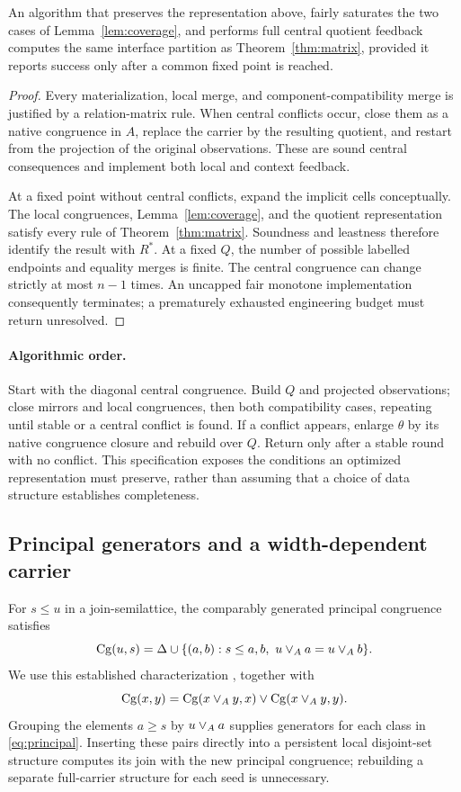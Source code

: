 \begin{theorem}\label{thm:sparse}
An algorithm that preserves the representation above, fairly saturates the two cases of Lemma~\ref{lem:coverage}, and performs full central quotient feedback computes the same interface partition as Theorem~\ref{thm:matrix}, provided it reports success only after a common fixed point is reached.
\end{theorem}
\begin{proof}
Every materialization, local merge, and component-compatibility merge is justified by a relation-matrix rule. When central conflicts occur, close them as a native congruence in $A$, replace the carrier by the resulting quotient, and restart from the projection of the original observations. These are sound central consequences and implement both local and context feedback.

At a fixed point without central conflicts, expand the implicit cells conceptually. The local congruences, Lemma~\ref{lem:coverage}, and the quotient representation satisfy every rule of Theorem~\ref{thm:matrix}. Soundness and leastness therefore identify the result with $R^*$. At a fixed $Q$, the number of possible labelled endpoints and equality merges is finite. The central congruence can change strictly at most $n-1$ times. An uncapped fair monotone implementation consequently terminates; a prematurely exhausted engineering budget must return unresolved.
\end{proof}

\paragraph{Algorithmic order.}
Start with the diagonal central congruence. Build $Q$ and projected observations; close mirrors and local congruences, then both compatibility cases, repeating until stable or a central conflict is found. If a conflict appears, enlarge $\theta$ by its native congruence closure and rebuild over $Q$. Return only after a stable round with no conflict. This specification exposes the conditions an optimized representation must preserve, rather than assuming that a choice of data structure establishes completeness.

\subsection{Principal generators and a width-dependent carrier}
For $s\le u$ in a join-semilattice, the comparably generated principal congruence satisfies
\begin{equation}\label{eq:principal}
\operatorname{Cg}(u,s)=\Delta\cup\{(a,b):s\le a,b,\ u\vee_A a=u\vee_A b\}.
\end{equation}
We use this established characterization \cite[Theorem~2.1]{MartinMaroto2026}, together with
\[
\operatorname{Cg}(x,y)=\operatorname{Cg}(x\vee_A y,x)\vee\operatorname{Cg}(x\vee_A y,y).
\]
Grouping the elements $a\ge s$ by $u\vee_A a$ supplies generators for each class in \eqref{eq:principal}. Inserting these pairs directly into a persistent local disjoint-set structure computes its join with the new principal congruence; rebuilding a separate full-carrier structure for each seed is unnecessary.

